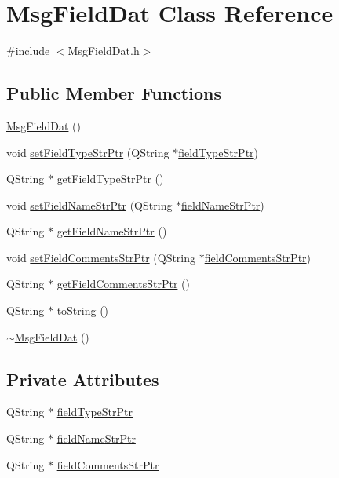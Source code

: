 \hypertarget{class_msg_field_dat}{\section{Msg\-Field\-Dat Class Reference}
\label{class_msg_field_dat}
}


{\ttfamily \#include $<$Msg\-Field\-Dat.\-h$>$}

\subsection*{Public Member Functions}
\begin{DoxyCompactItemize}
\item 
\hyperlink{class_msg_field_dat_a7b1ec6d1c6eaa385aa8c65178d9704df}{Msg\-Field\-Dat} ()
\item 
void \hyperlink{class_msg_field_dat_acc5b46ed5463d24746525fbabd089a79}{set\-Field\-Type\-Str\-Ptr} (Q\-String $\ast$\hyperlink{class_msg_field_dat_aeffe79541e1142808542de135916cc94}{field\-Type\-Str\-Ptr})
\item 
Q\-String $\ast$ \hyperlink{class_msg_field_dat_aae69f8851405bb605ec41e4eb9041b70}{get\-Field\-Type\-Str\-Ptr} ()
\item 
void \hyperlink{class_msg_field_dat_a8d99ed7c0f6e0c6c5feb4c39ca00a02e}{set\-Field\-Name\-Str\-Ptr} (Q\-String $\ast$\hyperlink{class_msg_field_dat_aa8d59c59c384ab7e489d35b35bdafcc0}{field\-Name\-Str\-Ptr})
\item 
Q\-String $\ast$ \hyperlink{class_msg_field_dat_a36f57281c434af6d0e8f0eb6ee8a1bb9}{get\-Field\-Name\-Str\-Ptr} ()
\item 
void \hyperlink{class_msg_field_dat_aa271799ae56df773766e82b28948b058}{set\-Field\-Comments\-Str\-Ptr} (Q\-String $\ast$\hyperlink{class_msg_field_dat_a837b0f0953bc4c697c9de2e262233ac3}{field\-Comments\-Str\-Ptr})
\item 
Q\-String $\ast$ \hyperlink{class_msg_field_dat_a259daca4c05d51fe0683be836f5257b7}{get\-Field\-Comments\-Str\-Ptr} ()
\item 
Q\-String $\ast$ \hyperlink{class_msg_field_dat_a606c7d76cce5b856c3a4210653d660be}{to\-String} ()
\item 
\hyperlink{class_msg_field_dat_aceca7989d37af550f5ad638b7cb2ca13}{$\sim$\-Msg\-Field\-Dat} ()
\end{DoxyCompactItemize}
\subsection*{Private Attributes}
\begin{DoxyCompactItemize}
\item 
Q\-String $\ast$ \hyperlink{class_msg_field_dat_aeffe79541e1142808542de135916cc94}{field\-Type\-Str\-Ptr}
\item 
Q\-String $\ast$ \hyperlink{class_msg_field_dat_aa8d59c59c384ab7e489d35b35bdafcc0}{field\-Name\-Str\-Ptr}
\item 
Q\-String $\ast$ \hyperlink{class_msg_field_dat_a837b0f0953bc4c697c9de2e262233ac3}{field\-Comments\-Str\-Ptr}
\end{DoxyCompactItemize}


